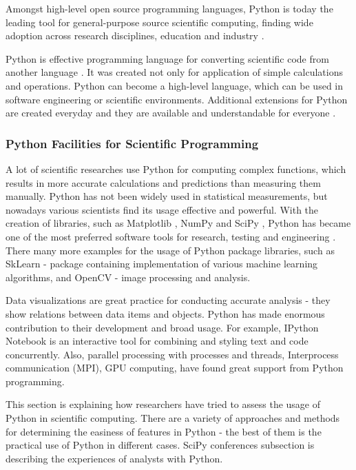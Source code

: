 
Amongst high-level open source programming languages, Python is today the leading tool for general-purpose source scientific computing, finding wide adoption across research disciplines, education and industry \cite{perez2013open}.

Python is effective programming language for converting scientific code from another language \cite{perez2013open}. It was created not only for application of simple calculations and operations. Python can become a high-level language, which can be used in software engineering or scientific environments. Additional extensions for Python are created everyday and they are available and understandable for everyone \cite{sanner1999python}.

\subsubsection{Python Facilities for Scientific Programming}

A lot of scientific researches use Python for computing complex functions, which results in more accurate calculations and predictions than measuring them manually. Python has not been widely used in statistical measurements, but nowadays various scientists find its usage effective and powerful. With the creation of libraries, such as Matplotlib \cite{matplotlib}, NumPy \cite{numpy} and SciPy \cite{scipyOff}, Python has became one of the most preferred software tools for research, testing and engineering \cite{perez2007ipython}. There many more examples for the usage of Python package libraries, such as SkLearn - package containing implementation of various machine learning algorithms, and OpenCV - image processing and analysis. \cite{sklearn}\cite{openCV}

Data visualizations are great practice for conducting accurate analysis - they show relations between data items and objects. Python has made enormous contribution to their development and broad usage. For example, IPython Notebook is an interactive tool for combining and styling text and code concurrently. Also, parallel processing with processes and threads, Interprocess communication (MPI), GPU computing, have found great support from Python programming.

This section is explaining how researchers have tried to assess the usage of Python in scientific computing. There are a variety of approaches and methods for determining the easiness of features in Python - the best of them is the practical use of Python in different cases. SciPy conferences subsection is describing the experiences of analysts with Python. 

